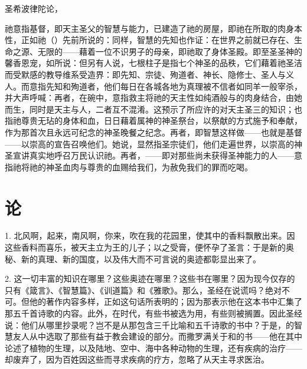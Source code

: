 圣希波律陀论，\par

祂意指基督，即天主圣父的智慧与能力，已建造了祂的房屋，即祂在所取的肉身本性，正如祂（）先前所说的：同样，智慧的先知也作证：在世界之前就已存在、生命之源、无限的——藉着一位不识男子的母亲，即祂取了身体圣殿。即至圣圣神的馨香恩宠，如所说：但另有人说，七根柱子是指七个神圣的品秩，它们藉着祂圣洁而受默感的教导维系受造界：即先知、宗徒、殉道者、神长、隐修士、圣人与义人。而意指先知和殉道者，他们每日在各城各地为真理被不信者如同羊一般宰杀，并大声呼喊：再者，在碗中，意指救主将祂的天主性如纯酒般与的肉身结合，由她而生，同时是天主与人，二者互不混淆。这预示了所应许的对天主圣三的知识；也指祂尊贵无玷的身体和血，日日藉着属神的神圣祭台，以祭献的方式施予和奉献，作为那首次且永远可纪念的神圣晚餐之纪念。再者，即智慧这样做——也就是基督——以崇高的宣告召唤他们。她说，显然指圣宗徒们，他们走遍世界，以崇高的神圣宣讲真实地呼召万民认识祂。再者，——即对那些尚未获得圣神能力的人——意指祂将祂的神圣血肉与尊贵的血赐给我们，为赦免我们的罪而吃喝。\par


\section{论 }

1. 北风啊，起来，南风啊，你来，吹在我的花园里，使其中的香料飘散出来。因这些香料而喜乐，被天主立为王的儿子；以之受膏，便怀孕了圣言：于是新的奥秘、新的真理、新的国度，以及伟大而不可言说的奥迹都彰显出来了。\par

2. 这一切丰富的知识在哪里？这些奥迹在哪里？这些书在哪里？因为现今仅存的只有《箴言》、《智慧篇》、《训道篇》和《雅歌》。那么，圣经在说谎吗？绝对不可。但他的著作内容多样，正如这句话所表明的；因为那表示他在这本书中汇集了那五千首诗歌的内容。此外，在时代，有些书被选为用，有些则被搁置。因此圣经说：他们从哪里抄录呢？岂不是从那包含三千比喻和五千诗歌的书中？于是，的智慧友人从中选取了那些有益于教会建设的部分。而撒罗满关于和的书——他在其中论述了植物的生理，以及陆地、空中、海中各种动物的生理，还有疾病的治疗——却废弃了，因为百姓因这些而寻求疾病的疗方，忽略了从天主寻求医治。\par

